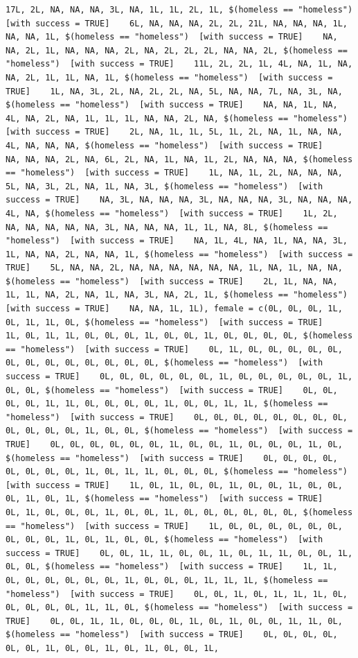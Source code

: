 \documentclass{tufte-book}\usepackage[]{graphicx}\usepackage[]{xcolor}
\makeatletter
\newenvironment{kframe}{%
 \def\at@end@of@kframe{}%
 \ifinner\ifhmode%
  \def\at@end@of@kframe{\end{minipage}}%
  \begin{minipage}{\columnwidth}%
 \fi\fi%
 \def\FrameCommand##1{\hskip\@totalleftmargin \hskip-\fboxsep
 \colorbox{shadecolor}{##1}\hskip-\fboxsep
     \hskip-\linewidth \hskip-\@totalleftmargin \hskip\columnwidth}%
 \MakeFramed {\advance\hsize-\width
   \@totalleftmargin\z@ \linewidth\hsize
   \@setminipage}}%
 {\par\unskip\endMakeFramed%
 \at@end@of@kframe}
\newenvironment{knitrout}{}{} %
\makeatother
\begin{document}
\begin{knitrout}
\begin{kframe}
\begin{verbatim}
17L, 2L, NA, NA, NA, 3L, NA, 1L, 1L, 2L, 1L, $(homeless == "homeless")  [with success = TRUE]    6L, NA, NA, NA, 2L, 2L, 21L, NA, NA, NA, 1L, NA, NA, 1L, $(homeless == "homeless")  [with success = TRUE]    NA, NA, 2L, 1L, NA, NA, NA, 2L, NA, 2L, 2L, 2L, NA, NA, 2L, $(homeless == "homeless")  [with success = TRUE]    11L, 2L, 2L, 1L, 4L, NA, 1L, NA, NA, 2L, 1L, 1L, NA, 1L, $(homeless == "homeless")  [with success = TRUE]    1L, NA, 3L, 2L, NA, 2L, 2L, NA, 5L, NA, NA, 7L, NA, 3L, NA, $(homeless == "homeless")  [with success = TRUE]    NA, NA, 1L, NA, 4L, NA, 2L, NA, 1L, 1L, 1L, NA, NA, 2L, NA, $(homeless == "homeless")  [with success = TRUE]    2L, NA, 1L, 1L, 5L, 1L, 2L, NA, 1L, NA, NA, 4L, NA, NA, NA, $(homeless == "homeless")  [with success = TRUE]    NA, NA, NA, 2L, NA, 6L, 2L, NA, 1L, NA, 1L, 2L, NA, NA, NA, $(homeless == "homeless")  [with success = TRUE]    1L, NA, 1L, 2L, NA, NA, NA, 5L, NA, 3L, 2L, NA, 1L, NA, 3L, $(homeless == "homeless")  [with success = TRUE]    NA, 3L, NA, NA, NA, 3L, NA, NA, NA, 3L, NA, NA, NA, 4L, NA, $(homeless == "homeless")  [with success = TRUE]    1L, 2L, NA, NA, NA, NA, NA, 3L, NA, NA, NA, 1L, 1L, NA, 8L, $(homeless == "homeless")  [with success = TRUE]    NA, 1L, 4L, NA, 1L, NA, NA, 3L, 1L, NA, NA, 2L, NA, NA, 1L, $(homeless == "homeless")  [with success = TRUE]    5L, NA, NA, 2L, NA, NA, NA, NA, NA, NA, 1L, NA, 1L, NA, NA, $(homeless == "homeless")  [with success = TRUE]    2L, 1L, NA, NA, 1L, 1L, NA, 2L, NA, 1L, NA, 3L, NA, 2L, 1L, $(homeless == "homeless")  [with success = TRUE]    NA, NA, 1L, 1L), female = c(0L, 0L, 0L, 1L, 0L, 1L, 1L, 0L, $(homeless == "homeless")  [with success = TRUE]    1L, 0L, 1L, 1L, 0L, 0L, 0L, 1L, 0L, 0L, 1L, 0L, 0L, 0L, 0L, $(homeless == "homeless")  [with success = TRUE]    0L, 1L, 0L, 0L, 0L, 0L, 0L, 0L, 0L, 0L, 0L, 0L, 0L, 0L, 0L, $(homeless == "homeless")  [with success = TRUE]    0L, 0L, 0L, 0L, 0L, 0L, 1L, 0L, 0L, 0L, 0L, 0L, 1L, 0L, 0L, $(homeless == "homeless")  [with success = TRUE]    0L, 0L, 0L, 0L, 1L, 1L, 0L, 0L, 0L, 0L, 1L, 0L, 0L, 1L, 1L, $(homeless == "homeless")  [with success = TRUE]    0L, 0L, 0L, 0L, 0L, 0L, 0L, 0L, 0L, 0L, 0L, 0L, 1L, 0L, 0L, $(homeless == "homeless")  [with success = TRUE]    0L, 0L, 0L, 0L, 0L, 0L, 1L, 0L, 0L, 1L, 0L, 0L, 0L, 1L, 0L, $(homeless == "homeless")  [with success = TRUE]    0L, 0L, 0L, 0L, 0L, 0L, 0L, 0L, 1L, 0L, 1L, 1L, 0L, 0L, 0L, $(homeless == "homeless")  [with success = TRUE]    1L, 0L, 1L, 0L, 0L, 1L, 0L, 0L, 1L, 0L, 0L, 0L, 1L, 0L, 1L, $(homeless == "homeless")  [with success = TRUE]    0L, 1L, 0L, 0L, 0L, 1L, 0L, 0L, 1L, 0L, 0L, 0L, 0L, 0L, 0L, $(homeless == "homeless")  [with success = TRUE]    1L, 0L, 0L, 0L, 0L, 0L, 0L, 0L, 0L, 0L, 1L, 0L, 1L, 0L, 0L, $(homeless == "homeless")  [with success = TRUE]    0L, 0L, 1L, 1L, 0L, 0L, 1L, 0L, 1L, 1L, 0L, 0L, 1L, 0L, 0L, $(homeless == "homeless")  [with success = TRUE]    1L, 1L, 0L, 0L, 0L, 0L, 0L, 0L, 1L, 0L, 0L, 0L, 1L, 1L, 1L, $(homeless == "homeless")  [with success = TRUE]    0L, 0L, 1L, 0L, 1L, 1L, 1L, 0L, 0L, 0L, 0L, 0L, 1L, 1L, 0L, $(homeless == "homeless")  [with success = TRUE]    0L, 0L, 1L, 1L, 0L, 0L, 0L, 1L, 0L, 1L, 0L, 0L, 1L, 1L, 0L, $(homeless == "homeless")  [with success = TRUE]    0L, 0L, 0L, 0L, 0L, 0L, 1L, 0L, 0L, 1L, 0L, 1L, 0L, 0L, 1L, 
\end{verbatim}
\end{kframe}
\end{knitrout}
\end{document}
